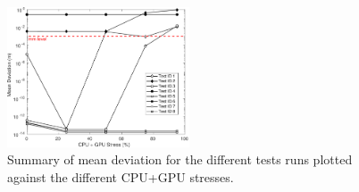 \begin{figure}[h]
    \centering
    \includegraphics[width=0.48\textwidth]{Other/Figures/ExperimentsStressSummary.pdf}
    \caption{Summary of mean deviation for the different tests runs plotted against the different CPU+GPU stresses.}

    \label{ExperimentsStressSummary}
\end{figure}

